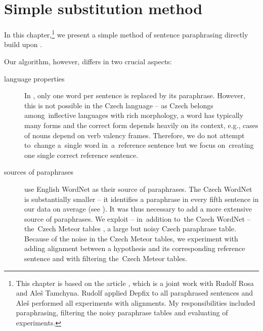 \chapter{Simple substitution method}

In this chapter,\footnote{This chapter is based on the article 
\citep{barancikova:2014}, which is a joint work with Rudolf Rosa and Ale\v{s} 
Tamchyna. Rudolf applied Depfix to all paraphrased sentences and Ale\v{s}
performed all experiments with alignments. My responsibilities included paraphrasing, 
filtering the noisy paraphrase tables and evaluating of experiments.} we present a simple 
method of sentence paraphrasing directly build upon \citep{kauchak}.

Our algorithm, however, differs in two crucial aspects:

\begin{description}
\item[language properties] In \citep{kauchak}, only one word per sentence is
replaced by its paraphrase. However, this is not possible in the Czech language
--  as Czech belongs among~inflective languages with rich morphology, a word 
has typically many forms and the correct form depends heavily on its context, 
e.g., cases of nouns depend on verb valency frames. Therefore, we do not attempt 
to~change a~single word in~a~reference sentence but we focus on~creating one 
single correct reference sentence.


\item[sources of paraphrases] \citeauthor{kauchak} use English WordNet as their 
source of paraphrases. The Czech WordNet \citep{czech-wordnet} is substantially 
smaller -- it identifies a paraphrase in every fifth sentence in our data on average 
(see ). 
It was thus necessary to add a more extensive source of paraphrases. We exploit 
--  in~addition to~the Czech WordNet --  the~Czech Meteor tables 
\citep{meteor-tables}, a large but noisy Czech paraphrase table. 
Because of the noise in the Czech Meteor tables, we experiment with adding 
alignment between a hypothesis and its corresponding reference sentence and 
with filtering the~Czech Meteor tables.

 \end{description}

